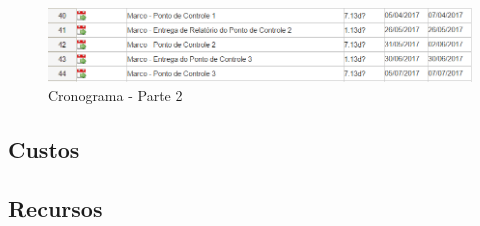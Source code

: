 \begin{figure}[h!]
	\centering
	\includegraphics[keepaspectratio=true,scale= 0.8]{figuras/cronograma-PI2-parte2.PNG}
	\caption{Cronograma - Parte 2}
	\label{eap}
\end{figure}

\subsection{Custos}



\subsection{Recursos}

